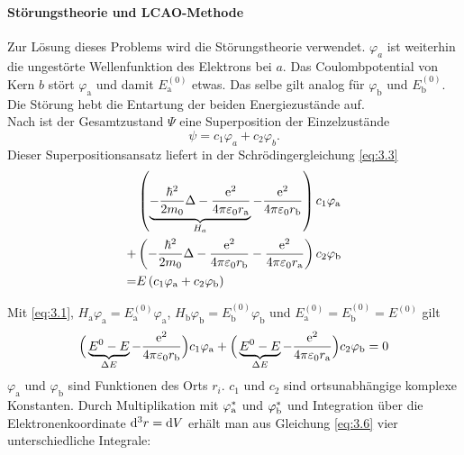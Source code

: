     \paragraph{Störungstheorie und LCAO-Methode}
    Zur Lösung dieses Problems wird die {Störungstheorie} verwendet. 
    $\varphi_a$ ist weiterhin die ungestörte Wellenfunktion des Elektrons bei $a$.
    Das Coulombpotential von Kern $b$ stört $ \varphi_\text{a} $ und damit $E_\text{a}^{(0)}$ etwas. 
    Das selbe gilt analog für $ \varphi_\text{b}$ und $E^{(0)}_\text{b}$. 
    Die Störung hebt die Entartung der beiden Energiezustände auf.\\

    Nach  ist der Gesamtzustand $\Psi$ eine Superposition der Einzelzustände
    \begin{equation}
        \label{eq:3.4}
        \psi = c_1 \varphi_{a} + c_2 \varphi_{b}.
    \end{equation}
    Dieser Superpositionsansatz liefert in der Schrödingergleichung \eqref{eq:3.3}
    \begin{equation}
        \label{eq:3.5}
        \begin{aligned}	
        &\left( \underbrace{- \frac{\hbar ^2}{2 m_0} \Delta - \frac{\mathrm{e}^2}{4 \pi \varepsilon_0 r_\text{a}}}_{H_{a}} - \frac{\mathrm{e}^2}{4 \pi \varepsilon_0 r_\text{b}} \right) c_1 \varphi_\text{a} \\ 
            +& \left( - \frac{\hbar ^2}{2 m_0} \Delta - \frac{\mathrm{e}^2}{4\pi \varepsilon_0 r_\text{b}} - \frac{\mathrm{e}^2}{4 \pi \varepsilon_0 r_\text{a}} \right) c_2 \varphi_\text b\\
            =& E \left( c_1 \varphi_\text{a}+ c_2 \varphi_\text{b} \right) 
        \end{aligned}
    \end{equation}

    Mit \eqref{eq:3.1}, $H_\text{a} \varphi_\text{a}= E_\text{a}^{(0)} \varphi_\text{a}$, $H_\text{b} \varphi_\text{b}= E_\text{b}^{(0)} \varphi_\text{b}$ und $E^{(0)}_\text{a} = E^{(0)}_\text{b} = E^{(0)}$ gilt
    \begin{equation}
        \label{eq:3.6}
        \Big( \underbrace{E^{0} -E}_{ \Delta E} - \frac{\mathrm{e}^2}{4 \pi \varepsilon_0 r_\text{b}}  \Big) c_1 \varphi_\text a + \Big( \underbrace{E^{0} -E}_{ \Delta E} - \frac{\mathrm{e}^2}{4 \pi \varepsilon_0 r_\text{a}} \Big) c_2 \varphi_\text{b} =0
    \end{equation}
    $\varphi_\text{a}$ und $\varphi_\text{b}$ sind Funktionen des Orts $r_i$. $c_1$ und $c_2$ sind ortsunabhängige komplexe Konstanten.
    Durch Multiplikation mit $\varphi^*_\text a$ und $\varphi^*_\text b$ und Integration über die Elektronenkoordinate $\mathrm d^3r = \text dV$ erhält man aus Gleichung \eqref{eq:3.6} vier unterschiedliche Integrale:
    
